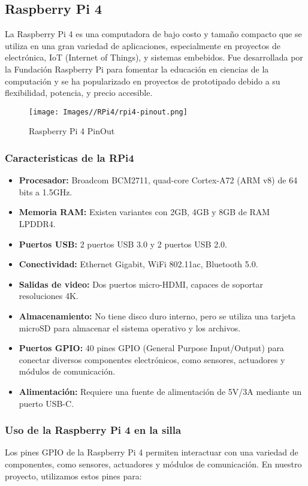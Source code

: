 \documentclass{article}
\begin{document}
\subsection{Raspberry Pi 4}
La Raspberry Pi 4 es una computadora de bajo costo y tamaño compacto que se utiliza en una gran variedad de aplicaciones, especialmente en proyectos de electrónica, IoT (Internet of Things), y sistemas embebidos. Fue desarrollada por la Fundación Raspberry Pi para fomentar la educación en ciencias de la computación y se ha popularizado en proyectos de prototipado debido a su flexibilidad, potencia, y precio accesible.
\begin{figure}[H]
    \centering
    \texttt{[image: Images//RPi4/rpi4-pinout.png]}
    \caption{Raspberry Pi 4 PinOut}
    \label{fig:enter-label}
\end{figure}

\subsubsection{Caracteristicas de la RPi4}
\begin{itemize}
    \item \textbf{Procesador:} Broadcom BCM2711, quad-core Cortex-A72 (ARM v8) de 64 bits a 1.5GHz.
    \item \textbf{Memoria RAM:} Existen variantes con 2GB, 4GB y 8GB de RAM LPDDR4.
    \item \textbf{Puertos USB:} 2 puertos USB 3.0 y 2 puertos USB 2.0.
    \item \textbf{Conectividad:} Ethernet Gigabit, WiFi 802.11ac, Bluetooth 5.0.
    \item \textbf{Salidas de video:} Dos puertos micro-HDMI, capaces de soportar resoluciones 4K.
    \item \textbf{Almacenamiento:} No tiene disco duro interno, pero se utiliza una tarjeta microSD para almacenar el sistema operativo y los archivos.
    \item \textbf{Puertos GPIO:} 40 pines GPIO (General Purpose Input/Output) para conectar diversos componentes electrónicos, como sensores, actuadores y módulos de comunicación.
    \item \textbf{Alimentación:} Requiere una fuente de alimentación de 5V/3A mediante un puerto USB-C.
\end{itemize}

\subsubsection{Uso de la Raspberry Pi 4 en la silla}
Los pines GPIO de la Raspberry Pi 4 permiten interactuar con una variedad de componentes, como sensores, actuadores y módulos de comunicación. En nuestro proyecto, utilizamos estos pines para:
\end{document}
